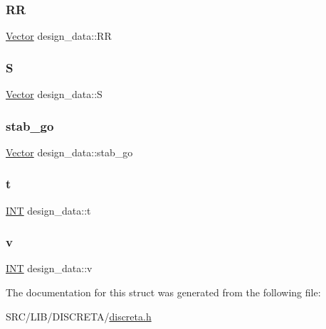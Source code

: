 \subsubsection{\texorpdfstring{RR}{RR}}
{\footnotesize\ttfamily \mbox{\hyperlink{class_vector}{Vector}} design\+\_\+data\+::\+RR}

\mbox{\label{structdesign__data_abe017c74acd9d051c9aec7e4c9c9b9bd}} 
\subsubsection{\texorpdfstring{S}{S}}
{\footnotesize\ttfamily \mbox{\hyperlink{class_vector}{Vector}} design\+\_\+data\+::S}

\mbox{\label{structdesign__data_a8d3d423c67401a5e1aa84b9fbb01bd15}} 
\subsubsection{\texorpdfstring{stab\+\_\+go}{stab\_go}}
{\footnotesize\ttfamily \mbox{\hyperlink{class_vector}{Vector}} design\+\_\+data\+::stab\+\_\+go}

\mbox{\label{structdesign__data_a02dcd27aba385f21649421532fa70f29}} 
\subsubsection{\texorpdfstring{t}{t}}
{\footnotesize\ttfamily \mbox{\hyperlink{galois_8h_a09fddde158a3a20bd2dcadb609de11dc}{I\+NT}} design\+\_\+data\+::t}

\mbox{\label{structdesign__data_a067dd8092d3afae1bb9fd865b2993028}} 
\subsubsection{\texorpdfstring{v}{v}}
{\footnotesize\ttfamily \mbox{\hyperlink{galois_8h_a09fddde158a3a20bd2dcadb609de11dc}{I\+NT}} design\+\_\+data\+::v}



The documentation for this struct was generated from the following file\+:\begin{DoxyCompactItemize}
\item 
S\+R\+C/\+L\+I\+B/\+D\+I\+S\+C\+R\+E\+T\+A/\mbox{\hyperlink{discreta_8h}{discreta.\+h}}\end{DoxyCompactItemize}
